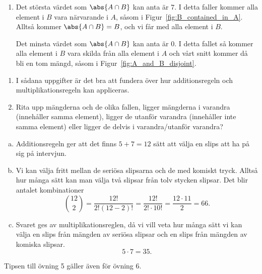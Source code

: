 \documentclass[nobib]{tufte-handout}
\begin{document}
\begin{solution}
\begin{enumerate}
		\item Det största värdet som $\abs{A \cap B}$ kan anta är $7$. I detta faller kommer alla element i $B$ vara närvarande i $A$, såsom i Figur~\ref{fig:B_contained_in_A}. Alltså kommer $\abs{A \cap B} = B$, och vi får med alla element i $B$.

		Det minsta värdet som $\abs{A \cap B}$ kan anta är $0$. I detta fallet så kommer alla element i $B$ vara skilda från alla element i $A$ och vårt snitt kommer då bli en tom mängd, såsom i Figur~\ref{fig:A_and_B_disjoint}.
	\end{enumerate}

	\begin{tips}
		\begin{enumerate}
			\item I sådana uppgifter är det bra att fundera över hur additionsregeln och multiplikationsregeln kan appliceras.
			\item Rita upp mängderna och de olika fallen, ligger mängderna i varandra (innehåller samma element), ligger de utanför varandra (innehåller inte samma element) eller ligger de delvis i varandra/utanför varandra?
		\end{enumerate}
	\end{tips}
\end{solution}

\begin{solution}

	\begin{enumerate}[a)]
		\item Additionsregeln ger att det finns $5 + 7 = 12$ sätt att välja en slips att ha på sig på intervjun.
		\item Vi kan välja fritt mellan de seriösa slipsarna och de med komiskt tryck.
		Alltså hur många sätt kan man välja två slipsar från tolv stycken slipsar.
		Det blir antalet kombinationer 
		$$\binom{12}{2} = \frac{12!}{2!(12-2)!} = \frac{12!}{2!\cdot 10!} = \frac{12\cdot 11}{2} = 66.$$
		\item Svaret ges av multiplikationsreglen, då vi vill veta hur många sätt vi kan välja en slips från mängden av seriösa slipsar och en slips från mängden av komiska slipsar.
		$$5\cdot 7 = 35.$$
	\end{enumerate}

	\begin{tips}
		Tipsen till övning 5 gäller även för övning 6.
	\end{tips}
\end{solution}

%
%
\end{document}
